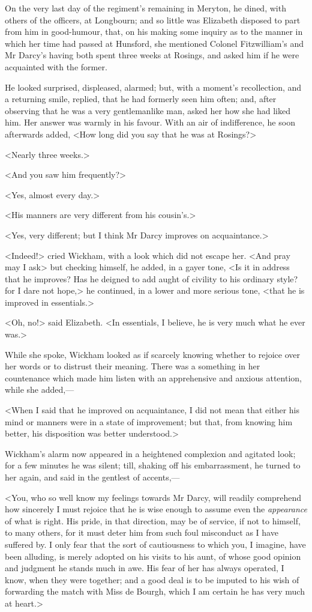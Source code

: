 On the very last day of the regiment's remaining in Meryton, he dined, with others of the officers, at Longbourn; and so little was Elizabeth disposed to part from him in good-humour, that, on his making some inquiry as to the manner in which her time had passed at Hunsford, she mentioned Colonel Fitzwilliam's and Mr Darcy's having both spent three weeks at Rosings, and asked him if he were acquainted with the former.

He looked surprised, displeased, alarmed; but, with a moment's recollection, and a returning smile, replied, that he had formerly seen him often; and, after observing that he was a very gentlemanlike man, asked her how she had liked him. Her answer was warmly in his favour. With an air of indifference, he soon afterwards added, <How long did you say that he was at Rosings?>

<Nearly three weeks.>

<And you saw him frequently?>

<Yes, almost every day.>

<His manners are very different from his cousin's.>

<Yes, very different; but I think Mr Darcy improves on acquaintance.>

<Indeed!> cried Wickham, with a look which did not escape her. <And pray may I ask\longdash> but checking himself, he added, in a gayer tone, <Is it in address that he improves? Has he deigned to add aught of civility to his ordinary style? for I dare not hope,> he continued, in a lower and more serious tone, <that he is improved in essentials.>

<Oh, no!> said Elizabeth. <In essentials, I believe, he is very much what he ever was.>

While she spoke, Wickham looked as if scarcely knowing whether to rejoice over her words or to distrust their meaning. There was a something in her countenance which made him listen with an apprehensive and anxious attention, while she added,—

<When I said that he improved on acquaintance, I did not mean that either his mind or manners were in a state of improvement; but that, from knowing him better, his disposition was better understood.>

Wickham's alarm now appeared in a heightened complexion and agitated look; for a few minutes he was silent; till, shaking off his embarrassment, he turned to her again, and said in the gentlest of accents,—

<You, who so well know my feelings towards Mr Darcy, will readily comprehend how sincerely I must rejoice that he is wise enough to assume even the \textit{appearance} of what is right. His pride, in that direction, may be of service, if not to himself, to many others, for it must deter him from such foul misconduct as I have suffered by. I only fear that the sort of cautiousness to which you, I imagine, have been alluding, is merely adopted on his visits to his aunt, of whose good opinion and judgment he stands much in awe. His fear of her has always operated, I know, when they were together; and a good deal is to be imputed to his wish of forwarding the match with Miss de Bourgh, which I am certain he has very much at heart.>

